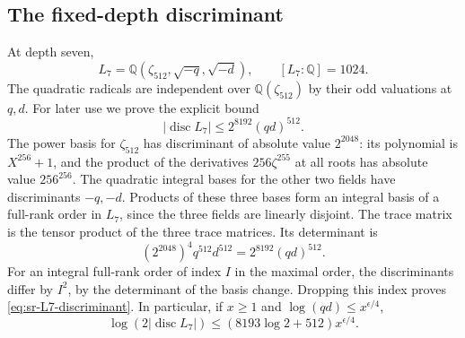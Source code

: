 \subsection{The fixed-depth discriminant}
At depth seven,
\[
 L_7=\mathbb Q(\zeta_{512},\sqrt{-q},\sqrt{-d}),\qquad
                         [L_7:\mathbb Q]=1024.
\]
The quadratic radicals are independent over
\(\mathbb Q(\zeta_{512})\) by their odd valuations at \(q,d\).
For later use we prove the explicit bound
\begin{equation}\label{eq:sr-L7-discriminant}
            |\operatorname{disc}L_7|
                     \leq2^{8192}(qd)^{512}.
\end{equation}
The power basis for \(\zeta_{512}\) has discriminant of absolute
value \(2^{2048}\): its polynomial is \(X^{256}+1\), and the
product of the derivatives \(256\zeta^{255}\) at all roots has
absolute value \(256^{256}\).
The quadratic integral bases for the other two fields have
discriminants \(-q,-d\).
Products of these three bases form an integral basis of a full-rank
order in \(L_7\), since the three fields are linearly disjoint.
The trace matrix is the tensor product of the three trace matrices.
Its determinant is
\[
       (2^{2048})^4 q^{512}d^{512}
                          =2^{8192}(qd)^{512}.
\]
For an integral full-rank order of index \(I\) in the maximal
order, the discriminants differ by \(I^2\), by the determinant
of the basis change.
Dropping this index proves \eqref{eq:sr-L7-discriminant}.
In particular, if \(x\geq1\) and \(\log(qd)\leq x^{\epsilon/4}\),
\begin{equation}\label{eq:sr-L7-logdisc}
 \log(2|\operatorname{disc}L_7|)
 \leq (8193\log2+512)x^{\epsilon/4}.
\end{equation}

